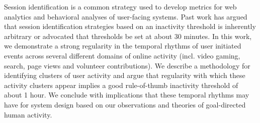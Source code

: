 Session identification is a common strategy used to develop metrics for web analytics and behavioral analyses of user-facing systems. Past work has argued that session identification strategies based on an inactivity threshold is inherently arbitrary or advocated that thresholds be set at about 30 minutes. In this work, we demonstrate a strong regularity in the temporal rhythms of user initiated events across several different domains of online activity (incl. video gaming, search, page views and volunteer contributions). We describe a methodology for identifying clusters of user activity and argue that regularity with which these activity clusters appear implies a good rule-of-thumb inactivity threshold of about 1 hour.  We conclude with implications that these temporal rhythms may have for system design based on our observations and theories of goal-directed human activity.
